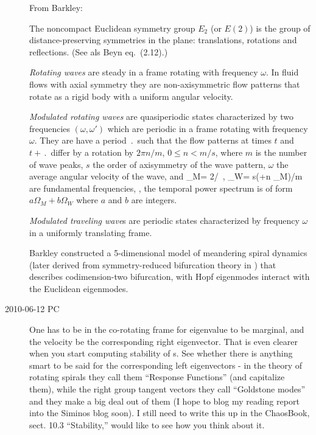 \begin{description}
From Barkley:

The noncompact Euclidean symmetry group $E_2$ (or $E(2)$) is the group of
distance-preserving symmetries in the plane: translations, rotations and
reflections.
(See als Beyn eq.~(2.12).)
                                    \toCB

\emph{Rotating waves} are steady
in a frame rotating with frequency $\omega$. In fluid flows with
axial symmetry they are non-axisymmetric flow patterns that
rotate as a rigid body with a uniform angular velocity.
                                    \toCB

\emph{Modulated rotating waves} are quasiperiodic states characterized
by two frequencies $(\omega,\omega')$ which are
periodic in a frame rotating with frequency $\omega$. They are
have
a period $\period{}$ such that the flow patterns
at times $t$ and $t+\period{}$ differ by a rotation by $2\pi n/m$,
$0 \leq n < m/s$,
where $m$ is the number of wave peaks, $s$ the order of
axisymmetry of the wave pattern, $\omega$ the average angular
velocity of the wave, and
                                    \toCB
\beq
\Omega_M= 2\pi /\period{}
	\,,\qquad
\Omega_W= s(\omega+n \Omega_M)/m
are fundamental frequencies, \ie, the temporal power spectrum
is of form $a\Omega_M+b \Omega_W$ where $a$ and $b$ are integers.

\emph{Modulated traveling wave}s are periodic states characterized
by frequency $\omega$ in a uniformly translating frame.

Barkley constructed a 5-dimensional model of meandering spiral dynamics
(later derived from symmetry-reduced bifurcation theory in
) that describes codimension-two bifurcation, with Hopf
eigenmodes interact with the Euclidean eigenmodes.

\item[2010-06-12 PC]                                            \toCB
One has to be in the co-rotating frame for eigenvalue to be marginal, and
the velocity be the corresponding right eigenvector. That is even clearer
when you start computing stability of \rpo s. See whether there is
anything smart to be said for the corresponding left eigenvectors - in
the theory of rotating spirals they call them ``Response Functions'' (and
capitalize them), while the right group tangent vectors they call
``Goldstone modes'' and they make a big deal out of them (I hope to blog
my reading report into the Siminos blog soon). I still need to write this
up in the ChaosBook, sect. 10.3 ``Stability,'' would like to see how you
think about it.



\end{description}
